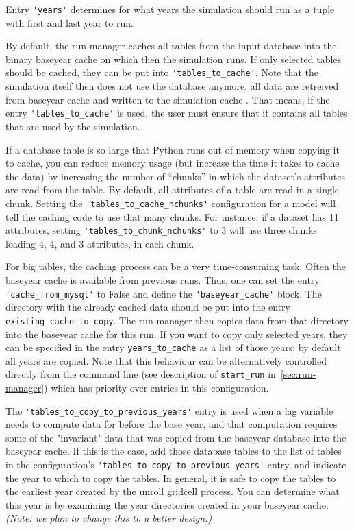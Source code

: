 Entry \verb|'years'| determines for what
years the simulation should run as a tuple with first and last year to run.

By default, the run manager \runmanagerindex caches all tables from the input database into the
binary baseyear cache \baseyearcacheindex on which then the simulation runs. If
only selected tables should be cached, they can be put into
\verb|'tables_to_cache'|. Note that the simulation itself then does not use the
database anymore, all data are retreived from baseyear cache \baseyearcacheindex
and written to the simulation cache \simulationcacheindex.  That means, if the
entry \verb|'tables_to_cache'| is used, the user must ensure that it contains
all tables that are used by the simulation.

If a database table is so large that Python \pythonindex runs out of memory when copying it
to cache, you can reduce memory usage (but increase the time it takes to cache
the data) by increasing the number of ``chunks'' in which the dataset's \datasetindex
attributes are read from the table.  By
default, all attributes of a table are read in a single chunk. Setting the
\verb|'tables_to_cache_nchunks'| configuration for a model will tell the caching code
to use that many chunks.  For instance, if a dataset has 11 attributes, setting
\verb|'tables_to_chunk_nchunks'| to 3 will use three chunks loading 4, 4, and 3
attributes, in each chunk.

For big tables, the caching process can be a very time-consuming task. Often
the baseyear cache \baseyearcacheindex is available from previous runs. Thus,
one can set the entry \verb|'cache_from_mysql'| \mysqlindex to False and define the
\verb|'baseyear_cache'| \baseyearcacheindex block. The directory with the already cached data
should be put into the entry \verb|existing_cache_to_copy|. The run manager \runmanagerindex then
copies data from that directory into the baseyear cache \baseyearcacheindex for this run. If you
want to copy only selected years, they can be specified in the entry
\verb|years_to_cache| as a list of those years; by default all years are
copied. Note that this behaviour can be alternatively controlled directly from
the command line (see description of \verb|start_run| in~\ref{sec:run-manager})
which has priority over entries in this configuration.

The \verb|'tables_to_copy_to_previous_years'| entry is used when a
lag variable needs to compute data for before the base year, and that
computation requires some of the "invariant" data that was copied from the
baseyear database into the baseyear cache.  If this is the case, add those
database tables to the list of tables in the configuration's
\verb|'tables_to_copy_to_previous_years'| entry, and indicate the year to which
to copy the tables.  In general, it is safe to copy the tables to the earliest
year created by the unroll gridcell process.  You can determine what this year
is by examining the year directories created in your baseyear cache.
\emph{(Note: we plan to change this to a better design.)}

